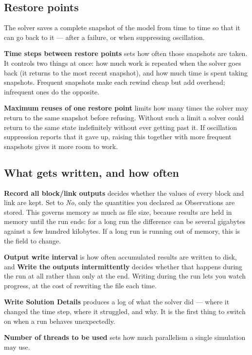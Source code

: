 \subsection{Restore points}

The solver saves a complete snapshot of the model from time to time so that it
can go back to it --- after a failure, or when suppressing oscillation.

\textbf{Time steps between restore points} sets how often those snapshots are
taken. It controls two things at once: how much work is repeated when the
solver goes back (it returns to the most recent snapshot), and how much time is
spent taking snapshots. Frequent snapshots make each rewind cheap but add
overhead; infrequent ones do the opposite.

\textbf{Maximum reuses of one restore point} limits how many times the solver
may return to the same snapshot before refusing. Without such a limit a solver
could return to the same state indefinitely without ever getting past it. If
oscillation suppression reports that it gave up, raising this together with more
frequent snapshots gives it more room to work.

\subsection{What gets written, and how often}

\textbf{Record all block/link outputs} decides whether the values of every block
and link are kept. Set to \emph{No}, only the quantities you declared as
Observations are stored. This governs memory as much as file size, because
results are held in memory until the run ends: for a long run the difference can
be several gigabytes against a few hundred kilobytes. If a long run is running
out of memory, this is the field to change.

\textbf{Output write interval} is how often accumulated results are written to
disk, and \textbf{Write the outputs intermittently} decides whether that
happens during the run at all rather than only at the end. Writing during the
run lets you watch progress, at the cost of rewriting the file each time.

\textbf{Write Solution Details} produces a log of what the solver did --- where
it changed the time step, where it struggled, and why. It is the first thing to
switch on when a run behaves unexpectedly.

\textbf{Number of threads to be used} sets how much parallelism a single
simulation may use.


